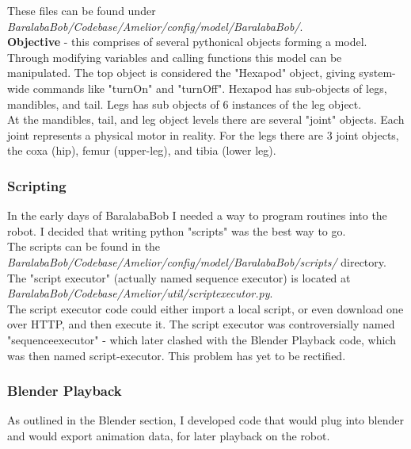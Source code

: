 					These files can be found under \textit{BaralabaBob/Codebase/Amelior/config/model/BaralabaBob/}. \\
					
					\textbf{Objective} - this comprises of several pythonical objects forming a model. Through modifying variables and calling functions this model can be manipulated. The top object is considered the "Hexapod" object, giving system-wide commands like "turnOn" and "turnOff". Hexapod has sub-objects of legs, mandibles, and tail. Legs has sub objects of 6 instances of the leg object. \\
					
					At the mandibles, tail, and leg object levels there are several "joint" objects. Each joint represents a physical motor in reality. For the legs there are 3 joint objects, the coxa (hip), femur (upper-leg), and tibia (lower leg).		\\
					
				\subsubsection{Scripting}
					In the early days of BaralabaBob I needed a way to program routines into the robot. I decided that writing python "scripts" was the best way to go.\\
					
					The scripts can be found in the \textit{BaralabaBob/Codebase/Amelior/config/model/BaralabaBob/scripts/} directory.\\
					
					The "script executor" (actually named sequence executor) is located at \textit{BaralabaBob/Codebase/Amelior/util/scriptexecutor.py}.\\
					
					The script executor code could either import a local script, or even download one over HTTP, and then execute it. The script executor was controversially named "sequenceexecutor" - which later clashed with the Blender Playback code, which was then named script-executor. This problem has yet to be rectified.
						
				\subsubsection{Blender Playback}	
					As outlined in the Blender section, I developed code that would plug into blender and would export animation data, for later playback on the robot.\\
					

